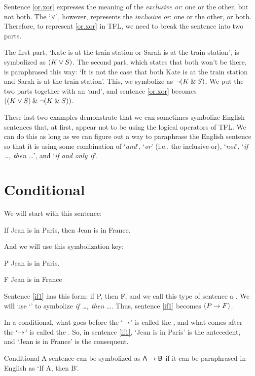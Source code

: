 Sentence \ref{or.xor} expresses the meaning of the \textit{exclusive or}: one or the other, but not both. The `$\vee$', however, represents the \textit{inclusive or}: one or the other, or both. Therefore, to represent \ref{or.xor} in TFL, we need to break the sentence into two parts. 

The first part, `Kate is at the train station or Sarah is at the train station', is symbolized as $(K \vee S)$. The second part, which states that both won't be there, is paraphrased this way: `It is not the case that both Kate is at the train station and Sarah is at the train station'. This, we symbolize as ${\neg}(K \mathbin{\&} S)$. We put the two parts together with an `and', and sentence \ref{or.xor} becomes $((K \vee S) \mathbin{\&}  {\neg}(K \mathbin{\&} S))$.

These last two examples demonstrate that we can sometimes symbolize English sentences that, at first, appear not to be using the logical operators of TFL. We can do this as long as we can figure out a way to paraphrase the English sentence so that it is using some combination of `\textit{and}', `\textit{or}' (i.e., the inclusive-or), `\textit{not}', `\textit{if \ldots, then \ldots}', and `\textit{if and only if}'. 


\section{Conditional}

We will start with this sentence:
	\begin{earg}
		\item[\ex{if1}] If Jean is in Paris, then Jean is in France.
	\end{earg}
And we will use this symbolization key:
	\begin{ekey}
		\item[P] Jean is in Paris.
		\item[F] Jean is in France
	\end{ekey}
Sentence \ref{if1} has this form: if P, then F, and we call this type of sentence a . We will use `\eif' to symbolize \textit{if \ldots, then \ldots}. Thus, sentence \ref{if1} becomes $(P\rightarrow F)$. 

In a conditional, what goes before the `$\rightarrow$'  is called the , and what comes after the `$\rightarrow$' is called the . So, in sentence \ref{if1}, `Jean is in Paris' is the antecedent, and `Jean is in France' is the consequent.

\begin{factboxy}{Conditional}
A sentence can be symbolized as $\mathsf{A} \rightarrow \mathsf{B}$ if it can be paraphrased in English as `If A, then B'.
\end{factboxy}

